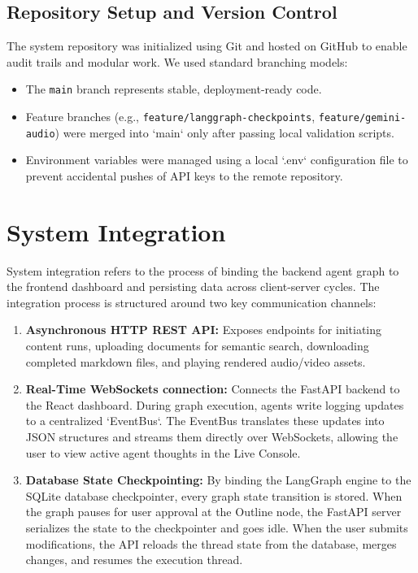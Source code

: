 \subsection{Repository Setup and Version Control}
The system repository was initialized using Git and hosted on GitHub to enable audit trails and modular work. We used standard branching models:
\begin{itemize}
    \item The \texttt{main} branch represents stable, deployment-ready code.
    \item Feature branches (e.g., \texttt{feature/langgraph-checkpoints}, \texttt{feature/gemini-audio}) were merged into `main` only after passing local validation scripts.
    \item Environment variables were managed using a local `.env` configuration file to prevent accidental pushes of API keys to the remote repository.
\end{itemize}

\section{System Integration}

System integration refers to the process of binding the backend agent graph to the frontend dashboard and persisting data across client-server cycles. The integration process is structured around two key communication channels:

\begin{enumerate}
    \item \textbf{Asynchronous HTTP REST API:} Exposes endpoints for initiating content runs, uploading documents for semantic search, downloading completed markdown files, and playing rendered audio/video assets.
    \item \textbf{Real-Time WebSockets connection:} Connects the FastAPI backend to the React dashboard. During graph execution, agents write logging updates to a centralized `EventBus`. The EventBus translates these updates into JSON structures and streams them directly over WebSockets, allowing the user to view active agent thoughts in the Live Console.
    \item \textbf{Database State Checkpointing:} By binding the LangGraph engine to the SQLite database checkpointer, every graph state transition is stored. When the graph pauses for user approval at the Outline node, the FastAPI server serializes the state to the checkpointer and goes idle. When the user submits modifications, the API reloads the thread state from the database, merges changes, and resumes the execution thread.
\end{enumerate}

